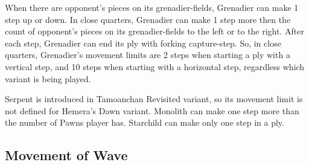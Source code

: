 When there are opponent's pieces on its grenadier-fields, Grenadier can make 1
step up or down. In close quarters, Grenadier can make 1 step more then the count
of opponent's pieces on its grenadier-fields to the left or to the right. After
each step, Grenadier can end its ply with forking capture-step. \newline
\indent
So, in close quarters, Grenadier's movement limits are 2 steps when starting
a ply with a vertical step, and 10 steps when starting with a horizontal step,
regardless which variant is being played.

Serpent is introduced in Tamoanchan Revisited variant, so its movement limit is
not defined for Hemera's Dawn variant. \newline
\indent
Monolith can make one step more than the number of Pawns player has.
Starchild can make only one step in a ply.

\clearpage %

\subsection*{Movement of Wave}
\label{sec:Appendix/Movement of Wave}

